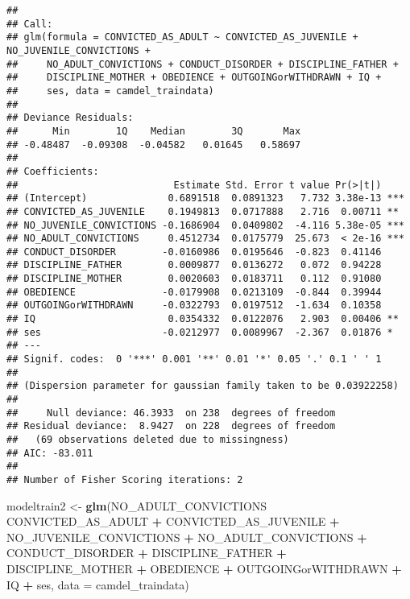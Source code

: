 \documentclass[]{article}
\newenvironment{Shaded}{\begin{snugshade}}{\end{snugshade}}
\newcommand{\KeywordTok}[1]{\textcolor[rgb]{0.13,0.29,0.53}{\textbf{#1}}}
\newcommand{\DataTypeTok}[1]{\textcolor[rgb]{0.13,0.29,0.53}{#1}}
\newcommand{\StringTok}[1]{\textcolor[rgb]{0.31,0.60,0.02}{#1}}
\newcommand{\OperatorTok}[1]{\textcolor[rgb]{0.81,0.36,0.00}{\textbf{#1}}}
\newcommand{\NormalTok}[1]{#1}
\begin{document}
\begin{verbatim}
## 
## Call:
## glm(formula = CONVICTED_AS_ADULT ~ CONVICTED_AS_JUVENILE + NO_JUVENILE_CONVICTIONS + 
##     NO_ADULT_CONVICTIONS + CONDUCT_DISORDER + DISCIPLINE_FATHER + 
##     DISCIPLINE_MOTHER + OBEDIENCE + OUTGOINGorWITHDRAWN + IQ + 
##     ses, data = camdel_traindata)
## 
## Deviance Residuals: 
##      Min        1Q    Median        3Q       Max  
## -0.48487  -0.09308  -0.04582   0.01645   0.58697  
## 
## Coefficients:
##                           Estimate Std. Error t value Pr(>|t|)    
## (Intercept)              0.6891518  0.0891323   7.732 3.38e-13 ***
## CONVICTED_AS_JUVENILE    0.1949813  0.0717888   2.716  0.00711 ** 
## NO_JUVENILE_CONVICTIONS -0.1686904  0.0409802  -4.116 5.38e-05 ***
## NO_ADULT_CONVICTIONS     0.4512734  0.0175779  25.673  < 2e-16 ***
## CONDUCT_DISORDER        -0.0160986  0.0195646  -0.823  0.41146    
## DISCIPLINE_FATHER        0.0009877  0.0136272   0.072  0.94228    
## DISCIPLINE_MOTHER        0.0020603  0.0183711   0.112  0.91080    
## OBEDIENCE               -0.0179908  0.0213109  -0.844  0.39944    
## OUTGOINGorWITHDRAWN     -0.0322793  0.0197512  -1.634  0.10358    
## IQ                       0.0354332  0.0122076   2.903  0.00406 ** 
## ses                     -0.0212977  0.0089967  -2.367  0.01876 *  
## ---
## Signif. codes:  0 '***' 0.001 '**' 0.01 '*' 0.05 '.' 0.1 ' ' 1
## 
## (Dispersion parameter for gaussian family taken to be 0.03922258)
## 
##     Null deviance: 46.3933  on 238  degrees of freedom
## Residual deviance:  8.9427  on 228  degrees of freedom
##   (69 observations deleted due to missingness)
## AIC: -83.011
## 
## Number of Fisher Scoring iterations: 2
\end{verbatim}

\begin{Shaded}
\begin{Highlighting}[]
\NormalTok{modeltrain2 <-}\StringTok{ }\KeywordTok{glm}\NormalTok{(NO_ADULT_CONVICTIONS }\OperatorTok{~}\StringTok{ }\NormalTok{CONVICTED_AS_ADULT }\OperatorTok{+}\StringTok{   }
\StringTok{                    }\NormalTok{CONVICTED_AS_JUVENILE }\OperatorTok{+}\StringTok{ }
\StringTok{                       }\NormalTok{NO_JUVENILE_CONVICTIONS }\OperatorTok{+}\StringTok{ }\NormalTok{NO_ADULT_CONVICTIONS }\OperatorTok{+}
\StringTok{                       }\NormalTok{CONDUCT_DISORDER }\OperatorTok{+}\StringTok{ }\NormalTok{DISCIPLINE_FATHER }\OperatorTok{+}\StringTok{ }
\StringTok{                       }\NormalTok{DISCIPLINE_MOTHER }\OperatorTok{+}\StringTok{  }\NormalTok{OBEDIENCE }\OperatorTok{+}\StringTok{ }\NormalTok{OUTGOINGorWITHDRAWN }\OperatorTok{+}\StringTok{ }
\StringTok{                       }\NormalTok{IQ }\OperatorTok{+}\StringTok{ }\NormalTok{ses, }\DataTypeTok{data =}\NormalTok{ camdel_traindata)}
\end{Highlighting}
\end{Shaded}
\end{document}

